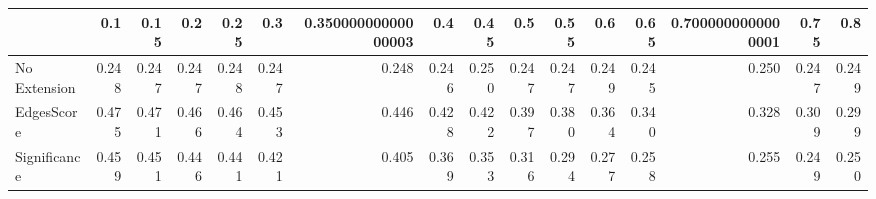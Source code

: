 \begin{tabular}{lrrrrrrrrrrrrrrr}
\toprule
{} &   0.1 &  0.15 &   0.2 &  0.25 &   0.3 & 0.35000000000000003 &   0.4 &  0.45 &   0.5 &  0.55 &   0.6 &  0.65 & 0.7000000000000001 &  0.75 &   0.8 \\
\midrule
No Extension & 0.248 & 0.247 & 0.247 & 0.248 & 0.247 &               0.248 & 0.246 & 0.250 & 0.247 & 0.247 & 0.249 & 0.245 &              0.250 & 0.247 & 0.249 \\
EdgesScore   & 0.475 & 0.471 & 0.466 & 0.464 & 0.453 &               0.446 & 0.428 & 0.422 & 0.397 & 0.380 & 0.364 & 0.340 &              0.328 & 0.309 & 0.299 \\
Significance & 0.459 & 0.451 & 0.446 & 0.441 & 0.421 &               0.405 & 0.369 & 0.353 & 0.316 & 0.294 & 0.277 & 0.258 &              0.255 & 0.249 & 0.250 \\
\bottomrule
\end{tabular}
